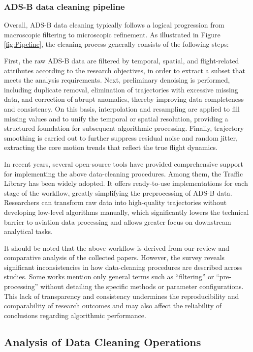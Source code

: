 \subsubsection{ADS-B data cleaning pipeline}

Overall, ADS-B data cleaning typically follows a logical progression from macroscopic filtering to microscopic refinement.
As illustrated in Figure \ref{fig:Pipeline}, the cleaning process generally consists of the following steps:

First, the raw ADS-B data are filtered by temporal, spatial, and flight-related attributes according to the research objectives, in order to extract a subset that meets the analysis requirements.
Next, preliminary denoising is performed, including duplicate removal, elimination of trajectories with excessive missing data, and correction of abrupt anomalies, thereby improving data completeness and consistency.
On this basis, interpolation and resampling are applied to fill missing values and to unify the temporal or spatial resolution, providing a structured foundation for subsequent algorithmic processing.
Finally, trajectory smoothing is carried out to further suppress residual noise and random jitter, extracting the core motion trends that reflect the true flight dynamics.

In recent years, several open-source tools have provided comprehensive support for implementing the above data-cleaning procedures. Among them, the Traffic Library \cite{olive2019traffic} has been widely adopted. It offers ready-to-use implementations for each stage of the workflow, greatly simplifying the preprocessing of ADS-B data. Researchers can transform raw data into high-quality trajectories without developing low-level algorithms manually, which significantly lowers the technical barrier to aviation data processing and allows greater focus on downstream analytical tasks.

It should be noted that the above workflow is derived from our review and comparative analysis of the collected papers. However, the survey reveals significant inconsistencies in how data-cleaning procedures are described across studies. Some works mention only general terms such as “filtering” or “pre-processing” without detailing the specific methods or parameter configurations. This lack of transparency and consistency undermines the reproducibility and comparability of research outcomes and may also affect the reliability of conclusions regarding algorithmic performance.

\subsection{Analysis of Data Cleaning Operations}

